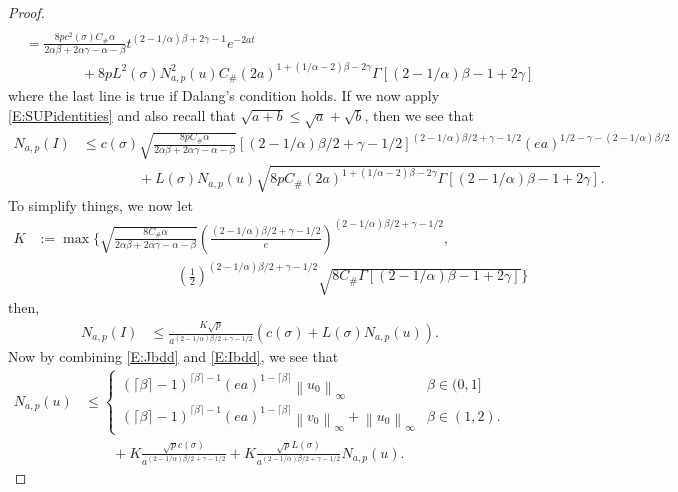 \documentclass[a4paper,11pt]{article}
\numberwithin{equation}{section}
\theoremstyle{plain}
\theoremstyle{definition}
\newcommand{\Norm}[1]{\left\|  #1   \right\|}
\numberwithin{NQ}{section}
\numberwithin{LQ}{section}
\numberwithin{ZQ}{section}
\begin{document}
\begin{proof}
\begin{align*}
	\\& = \frac{8pc^2(\sigma)C_{\#} \alpha }{2\alpha\beta + 2\alpha \gamma - \alpha - \beta} t^{(2-1/\alpha)\beta + 2\gamma -1} e^{-2at} 
	\\&\quad\quad\quad\quad+ 8pL^2(\sigma)N^2_{a,p}(u) C_{\#} (2a)^{1+(1/\alpha - 2)\beta - 2\gamma}\Gamma\left[ (2-1/\alpha)\beta-1+2\gamma \right]
	\end{align*}
where the last line is true if Dalang's condition \cite{CHN19} holds. If we now apply \eqref{E:SUPidentities} and also recall that $\sqrt{a+b} \le \sqrt{a} + \sqrt{b}$, then we see that 
	\begin{align}
	N_{a,p}(I) &\le  c(\sigma)\sqrt{\frac{8pC_{\#} \alpha }{2\alpha\beta + 2\alpha \gamma - \alpha - \beta}} \left[(2-1/\alpha)\beta/2+\gamma-1/2\right]^{(2-1/\alpha)\beta/2+\gamma-1/2}(ea)^{1/2 - \gamma - (2-1/\alpha)\beta/2} \nonumber \\
	&\quad\quad\quad\quad+ L(\sigma)N_{a,p}(u) \sqrt{8pC_{\#} (2a)^{1+(1/\alpha - 2)\beta - 2\gamma}\Gamma\left[ (2-1/\alpha)\beta-1+2\gamma \right]}. \label{E:SoleMil3.9}
	\end{align}
To simplify things, we now let 
	\begin{align*}
		K&:= \max\Bigg\{\sqrt{\frac{8C_{\#} \alpha }{2\alpha\beta + 2\alpha \gamma - \alpha - \beta}}\left(\frac{(2-1/\alpha)\beta/2+\gamma-1/2}{e}\right)^{(2-1/\alpha)\beta/2+\gamma-1/2},
		\\& \hspace{10em} \left(\frac{1}{2}\right)^{(2-1/\alpha)\beta/2+\gamma-1/2} \sqrt{8C_{\#}\Gamma\left[ (2-1/\alpha)\beta-1+2\gamma \right]}  \Bigg\}
	\end{align*}
then,
	\begin{align}
	\label{E:Ibdd}
			N_{a,p}(I) &\le\frac{K \sqrt{p}}{a^{(2-1/\alpha)\beta/2 + \gamma - 1/2}}\left( c(\sigma) + L(\sigma)N_{a,p}(u) \right).
	\end{align}
Now by combining \eqref{E:Jbdd} and \eqref{E:Ibdd}, we see that 
	\begin{align}
	N_{a,p}(u) & \le \begin{cases} 
	(\lceil \beta \rceil - 1)^{\lceil \beta \rceil -1}(ea)^{1-\lceil \beta \rceil} \Norm{u_0}_\infty  & \beta \in (0,1]
	\\ (\lceil \beta \rceil - 1)^{\lceil \beta \rceil -1}(ea)^{1-\lceil \beta \rceil} \Norm{v_0}_\infty + \Norm{u_0}_\infty & \beta \in (1,2). 
	\end{cases} 
	\\& \quad \quad  + K\frac{\sqrt{p}c(\sigma)}{a^{(2-1/\alpha)\beta/2+\gamma-1/2}}  + K  \frac{\sqrt{p}L(\sigma)}{a^{(2-1/\alpha)\beta/2+\gamma-1/2}} N_{a,p}(u). \label{E:Nbddgen}

\end{align}
\end{proof}
\end{document}
